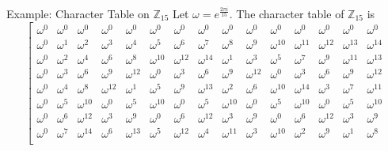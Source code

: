 \documentclass[12pt]{beamer}
\newcommand{\bbZ}{\mathbb{Z}}
\begin{document}
\begin{frame}{Example: Character Table on $\bbZ_{15}$}
Let $\omega=e^{\tfrac{2\pi i}{15}}.$ The character table of $\bbZ_{15}$ is
\footnotesize{
\begin{equation*}
\left[
\begin{array}{ccccccccccccccc}
\omega^{ 0}  &   \omega^{ 0}  &   \omega^{ 0}  &   \omega^{ 0}  &   \omega^{ 0}  &   \omega^{ 0}  &   \omega^{ 0}  &   \omega^{ 0}  &   \omega^{ 0}  &   \omega^{ 0}  &   \omega^{ 0}  &   \omega^{ 0}  &   \omega^{ 0}  &   \omega^{ 0}  &   \omega^{ 0}\\
\omega^{ 0}  &   \omega^{ 1}  &   \omega^{ 2}  &   \omega^{ 3}  &   \omega^{ 4}  &   \omega^{ 5}  &   \omega^{ 6}  &   \omega^{ 7}  &   \omega^{ 8}  &   \omega^{ 9}  &   \omega^{10}  &   \omega^{11}  &   \omega^{12}  &   \omega^{13}  &   \omega^{14}\\
\omega^{ 0}  &   \omega^{ 2}  &   \omega^{ 4}  &   \omega^{ 6}  &   \omega^{ 8}  &   \omega^{10}  &   \omega^{12}  &   \omega^{14}  &   \omega^{ 1}  &   \omega^{ 3}  &   \omega^{ 5}  &   \omega^{ 7}  &   \omega^{ 9}  &   \omega^{11}  &   \omega^{13}\\
\omega^{ 0}  &   \omega^{ 3}  &   \omega^{ 6}  &   \omega^{ 9}  &   \omega^{12}  &   \omega^{ 0}  &   \omega^{ 3}  &   \omega^{ 6}  &   \omega^{ 9}  &   \omega^{12}  &   \omega^{ 0}  &   \omega^{ 3}  &   \omega^{ 6}  &   \omega^{ 9}  &   \omega^{12}\\
\omega^{ 0}  &   \omega^{ 4}  &   \omega^{ 8}  &   \omega^{12}  &   \omega^{ 1}  &   \omega^{ 5}  &   \omega^{ 9}  &   \omega^{13}  &   \omega^{ 2}  &   \omega^{ 6}  &   \omega^{10}  &   \omega^{14}  &   \omega^{ 3}  &   \omega^{ 7}  &   \omega^{11}\\
\omega^{ 0}  &   \omega^{ 5}  &   \omega^{10}  &   \omega^{ 0}  &   \omega^{ 5}  &   \omega^{10}  &   \omega^{ 0}  &   \omega^{ 5}  &   \omega^{10}  &   \omega^{ 0}  &   \omega^{ 5}  &   \omega^{10}  &   \omega^{ 0}  &   \omega^{ 5}  &   \omega^{10}\\
\omega^{ 0}  &   \omega^{ 6}  &   \omega^{12}  &   \omega^{ 3}  &   \omega^{ 9}  &   \omega^{ 0}  &   \omega^{ 6}  &   \omega^{12}  &   \omega^{ 3}  &   \omega^{ 9}  &   \omega^{ 0}  &   \omega^{ 6}  &   \omega^{12}  &   \omega^{ 3}  &   \omega^{ 9}\\
\omega^{ 0}  &   \omega^{ 7}  &   \omega^{14}  &   \omega^{ 6}  &   \omega^{13}  &   \omega^{ 5}  &   \omega^{12}  &   \omega^{ 4}  &   \omega^{11}  &   \omega^{ 3}  &   \omega^{10}  &   \omega^{ 2}  &   \omega^{ 9}  &   \omega^{ 1}  &   \omega^{ 8}\\

\end{array}
\end{equation*}}
\end{frame}
\end{document}
